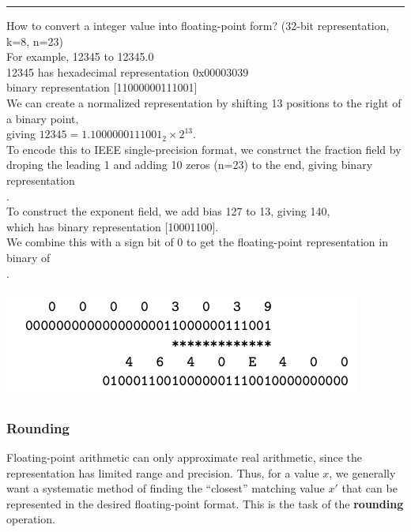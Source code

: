 \documentclass[11pt]{article}
\begin{document}
\noindent\rule{\textwidth}{0.5pt}
How to convert a integer value into floating-point form? (32-bit representation, k=8, n=23)\\
For example, 12345 to 12345.0\\
12345 has hexadecimal representation 0x00003039\\
binary representation [11000000111001]\\
We can create a normalized representation by shifting 13 positions to the right of a binary point,\\
giving \(12345 = 1.1000000111001_2 \times 2^{13}\).\\
To encode this to IEEE single-precision format, we construct the fraction field by\\
droping the leading 1 and adding 10 zeros (n=23) to the end, giving binary representation\\
[10000001110010000000000].\\
To construct the exponent field, we add bias 127 to 13, giving 140,\\
which has binary representation [10001100].\\
We combine this with a sign bit of 0 to get the floating-point representation in binary of\\
[01000110010000001110010000000000].\\

\begin{center}
\includegraphics[width=.9\linewidth]{pics/integer-floating-point-convertion.png}
\end{center}


\subsubsection{Rounding}
\label{sec:orgc47e2fa}
Floating-point arithmetic can only approximate real arithmetic, since the representation has limited range and precision. Thus, for a value \(x\), we generally want a systematic method of finding the “closest” matching value \(x'\) that can be represented in the desired floating-point format. This is the task of the \textbf{rounding} operation.\\
\end{document}
